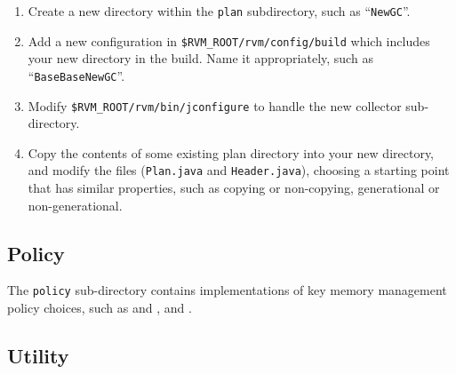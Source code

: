 %
%
\begin{enumerate}
\item Create a new directory within the \texttt{plan} subdirectory, such as
  ``\texttt{NewGC}''.
\item Add a new configuration in \texttt{\$RVM\_\-ROOT/rvm/config/build}
  which includes your new directory in the build.  Name it
  appropriately, such as ``\texttt{BaseBaseNewGC}''.
\item Modify \texttt{\$RVM\_\-ROOT/rvm/bin/jconfigure} to handle the new
  collector sub-directory.
\item Copy the contents of some existing plan directory into your new
  directory, and modify the files (\texttt{Plan.java} and
  \texttt{Header.java}), choosing a starting point that has similar
  properties, such as copying or non-copying, generational or
  non-generational.
\end{enumerate}

\subsection{Policy} \label{sssec:policy}

The \texttt{policy} sub-directory contains implementations of key
memory management policy choices, such as  and ,  and .

\subsection{Utility} \label{sssec:utility}


